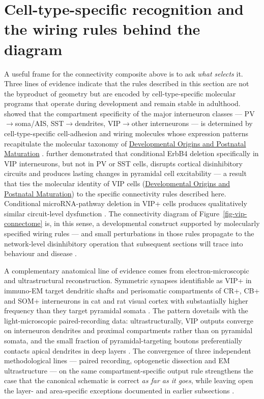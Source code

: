 \documentclass[11pt]{article}
\let\origrightarrow\rightarrow
\def\rightarrow{\ensuremath{\origrightarrow}}
\begin{document}
\section{Cell-type-specific recognition and the wiring rules behind the diagram}

A useful frame for the connectivity composite above is to ask \textit{what selects} it. Three lines of evidence indicate that the rules described in this section are not the byproduct of geometry but are encoded by cell-type-specific molecular programs that operate during development and remain stable in adulthood. \citet{Favuzzi2019} showed that the compartment specificity of the major interneuron classes --- PV\rightarrow soma/AIS, SST\rightarrow dendrites, VIP\rightarrow other interneurons --- is determined by cell-type-specific cell-adhesion and wiring molecules whose expression patterns recapitulate the molecular taxonomy of \href{/development}{Developmental Origins and Postnatal Maturation} \citep{Tasic2018, Pronneke2019, Frazer2017, Favuzzi2019}. \citet{Batistabrito2017} further demonstrated that conditional ErbB4 deletion specifically in VIP interneurons, but not in PV or SST cells, disrupts cortical disinhibitory circuits and produces lasting changes in pyramidal cell excitability --- a result that ties the molecular identity of VIP cells (\href{/development}{Developmental Origins and Postnatal Maturation}) to the specific connectivity rules described here. Conditional microRNA-pathway deletion in VIP+ cells produces qualitatively similar circuit-level dysfunction \citep{Qiu2020, Favuzzi2019}. The connectivity diagram of Figure~\ref{fig-vip-connectome} is, in this sense, a developmental construct supported by molecularly specified wiring rules --- and small perturbations in those rules propagate to the network-level disinhibitory operation that subsequent sections will trace into behaviour and disease \citep{Favuzzi2019, Batistabrito2017, Qiu2020, Tasic2018, Pronneke2019, Simacek2025a}.

A complementary anatomical line of evidence comes from electron-microscopic and ultrastructural reconstruction. Symmetric synapses identifiable as VIP+ in immuno-EM target dendritic shafts and perisomatic compartments of CR+, CB+ and SOM+ interneurons in cat and rat visual cortex with substantially higher frequency than they target pyramidal somata \citep{Defelipe1999}. The pattern dovetails with the light-microscopic paired-recording data: ultrastructurally, VIP outputs converge on interneuron dendrites and proximal compartments rather than on pyramidal somata, and the small fraction of pyramidal-targeting boutons preferentially contacts apical dendrites in deep layers \citep{Defelipe1999}. The convergence of three independent methodological lines --- paired recording, optogenetic dissection and EM ultrastructure --- on the same compartment-specific output rule strengthens the case that the canonical schematic is correct \textit{as far as it goes}, while leaving open the layer- and area-specific exceptions documented in earlier subsections \citep{Hajos1996, Defelipe1999, Pfeffer2013, Yu2019, Anastasiades2021a, Walker2016}.
\end{document}
